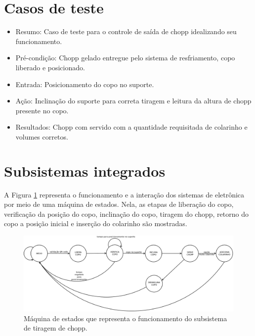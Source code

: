 \section{Casos de teste}

\begin{itemize}

    \item Resumo: Caso de teste para o controle de saída de chopp idealizando seu funcionamento. 

    \item Pré-condição: Chopp gelado entregue pelo sistema de resfriamento, copo liberado e posicionado.

    \item Entrada: Posicionamento do copo no suporte.

    \item Ação: Inclinação do suporte para correta tiragem e leitura da altura de chopp presente no copo.

    \item Resultados: Chopp com servido com a quantidade requisitada de colarinho e volumes corretos.

\end{itemize}        

\section{Subsistemas integrados}
A Figura \ref{state_machine} representa o funcionamento e a interação dos sistemas de eletrônica por meio
de uma máquina de estados. Nela, as etapas de liberação do copo, verificação da posição do copo, inclinação do copo,
tiragem do chopp, retorno do copo a posição inicial e inserção do colarinho são mostradas.

\begin{figure}[!htb]
            \centering
         	\includegraphics[scale= 0.2]{figuras/maquina_estado_eletronica.png}
            \caption{Máquina de estados que representa o funcionamento do subsistema de tiragem de chopp.}
            \label{state_machine}
\end{figure}
 
